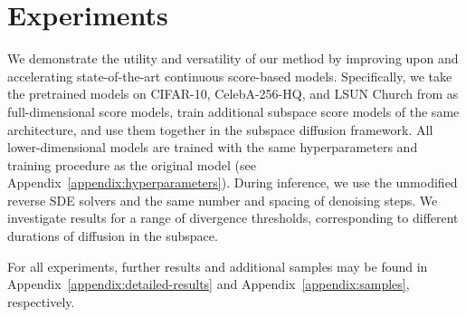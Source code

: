 \documentclass{article}
\begin{document}
\section{Experiments} \label{sec:experiments}

We demonstrate the utility and versatility of our method by improving upon and accelerating state-of-the-art continuous score-based models. Specifically, we take the pretrained models on CIFAR-10, CelebA-256-HQ, and LSUN Church from \cite{song2021score} as full-dimensional score models, train additional subspace score models of the same architecture, and use them together in the subspace diffusion framework. All lower-dimensional models are trained with the same hyperparameters and training procedure as the original model (see Appendix~\ref{appendix:hyperparameters}). During inference, we use the unmodified reverse SDE solvers and the same number and spacing of denoising steps. We investigate results for a range of divergence thresholds, corresponding to different durations of diffusion in the subspace.

For all experiments, further results and additional samples may be found in Appendix~\ref{appendix:detailed-results} and Appendix~\ref{appendix:samples}, respectively.
\end{document}
